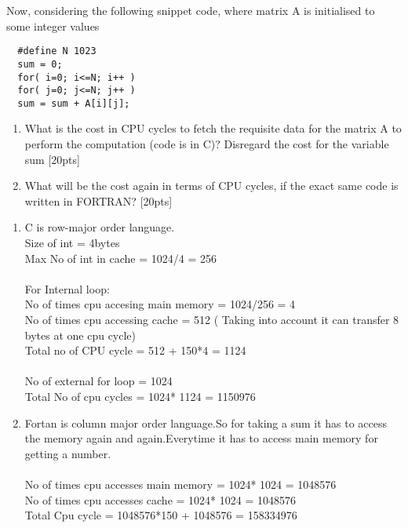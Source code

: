 \documentclass[12pt]{exam}
\begin{document}
\begin{questions}
  Now, considering the following snippet code, where matrix A is initialised 
  to some integer values
  \begin{lstlisting}
  #define N 1023
  sum = 0;
  for( i=0; i<=N; i++ )
  for( j=0; j<=N; j++ )
  sum = sum + A[i][j];
  \end{lstlisting}
  \begin{enumerate}[label=(\alph*)]
      \item What is the cost in CPU cycles to fetch the requisite data for the matrix A to
  perform the computation (code is in C)? Disregard the cost for the variable sum
  [20pts]
  \item What will be the cost again in terms of CPU cycles, if the exact same code is
  written in FORTRAN? [20pts]
    \end{enumerate}
    \begin{solution} 
  \begin{enumerate}[label=(\alph*)]
      \item
        C is row-major order language. \\
        Size of int =  4bytes \\
        Max No of int in cache = 1024/4 = 256 \\
        \\ 
        For Internal loop: \\
        No of times cpu accesing main memory = 1024/256 = 4 \\ 
        No of times cpu accessing cache = 512  ( Taking into account it can transfer 8 bytes at one cpu cycle) \\
        Total no of CPU cycle = 512 + 150*4 =  1124 \\ \\

        No of external for loop = 1024 \\
        Total No of cpu cycles = 1024* 1124 = 1150976 \\

    \item
        Fortan is column major order language.So for taking a sum it has
        to access the memory again and again.Everytime it has to access main memory
        for getting a  number.\\ \\
        No of times cpu accesses main memory = 1024* 1024 =  1048576 \\
        No of times cpu accesses cache = 1024* 1024 =  1048576 \\
        Total Cpu cycle = 1048576*150 + 1048576 = 158334976

        
    \end{enumerate}
    \end{solution}

\end{questions}
\end{document}
